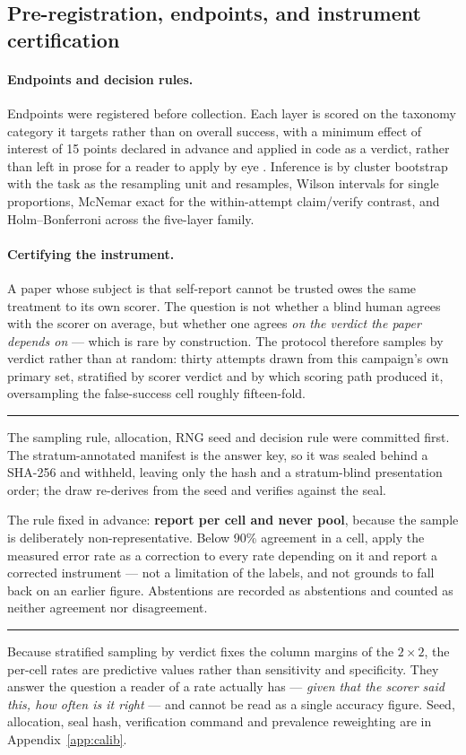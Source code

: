 \documentclass[11pt]{article}
\newcommand{\runin}[1]{\paragraph{#1}}
\newenvironment{callout}[1]
  {\par\medskip\noindent\rule{\linewidth}{0.9pt}\par\nobreak\smallskip
   \noindent{\footnotesize\textsc{#1}}\par\nobreak\smallskip\small}
  {\par\smallskip\noindent\rule{\linewidth}{0.4pt}\par\medskip}
\begin{document}
\subsection{Pre-registration, endpoints, and instrument certification}
\label{sec:prereg}

\runin{Endpoints and decision rules.}
Endpoints were registered before collection. Each layer is scored on the
taxonomy category it targets rather than on overall success, with a
minimum effect of interest of 15 points declared in advance and applied
in code as a verdict, rather than left in prose for a reader to apply by
eye \citep{kohavi2020}. Inference is by cluster bootstrap with the task
as the resampling unit and \Resamples{} resamples, Wilson intervals for
single proportions, McNemar exact for the within-attempt claim/verify
contrast, and Holm--Bonferroni across the five-layer family.

\runin{Certifying the instrument.}
A paper whose subject is that self-report cannot be trusted owes the
same treatment to its own scorer. The question is not whether a blind
human agrees with the scorer on average, but whether one agrees \emph{on
the verdict the paper depends on} --- which is rare by construction. The
protocol therefore samples by verdict rather than at random: thirty
attempts drawn from this campaign's own primary set, stratified by
scorer verdict and by which scoring path produced it, oversampling the
false-success cell roughly fifteen-fold.

\begin{callout}{Registered before any card was rendered}
The sampling rule, allocation, RNG seed and decision rule were committed
first. The stratum-annotated manifest is the answer key, so it was
sealed behind a SHA-256 and withheld, leaving only the hash and a
stratum-blind presentation order; the draw re-derives from the seed and
verifies against the seal.

\smallskip
The rule fixed in advance: \textbf{report per cell and never pool},
because the sample is deliberately non-representative. Below 90\%
agreement in a cell, apply the measured error rate as a correction to
every rate depending on it and report a corrected instrument --- not a
limitation of the labels, and not grounds to fall back on an earlier
figure. Abstentions are recorded as abstentions and counted as neither
agreement nor disagreement.
\end{callout}

Because stratified sampling by verdict fixes the column margins of the
$2 \times 2$, the per-cell rates are predictive values rather than
sensitivity and specificity. They answer the question a reader of a rate
actually has --- \emph{given that the scorer said this, how often is it
right} --- and cannot be read as a single accuracy figure. Seed,
allocation, seal hash, verification command and prevalence reweighting
are in Appendix~\ref{app:calib}.
\end{document}
